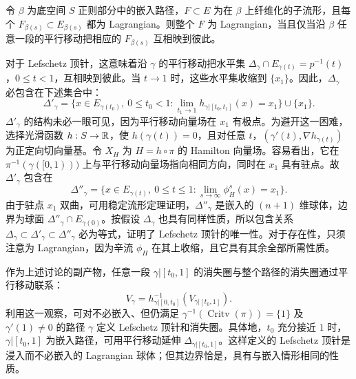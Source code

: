 \clearpage
{}\begin{lemma}\label{st:16.3}
令 $\beta$ 为底空间 $S$ 正则部分中的嵌入路径，$F\subset E$ 为在 $\beta$ 上纤维化的子流形，且每个 $F_{\beta(s)}\subset E_{\beta(s)}$ 都为 Lagrangian。则整个 $F$ 为 Lagrangian，当且仅当沿 $\beta$ 任意一段的平行移动把相应的 $F_{\beta(s)}$ 互相映到彼此。
\end{lemma}

对于 Lefschetz 顶针，这意味着沿 $\gamma$ 的平行移动把水平集 $\Delta_\gamma\cap E_{\gamma(t)}=p^{-1}(t)$，$0\leq t<1$，互相映到彼此。当 $t\to1$ 时，这些水平集收缩到 $\{x_1\}$。因此，$\Delta_\gamma$ 必包含在下述集合中：
\[
\Delta'_\gamma=\{x\in E_{\gamma(t_0)},\ 0\leq t_0<1:
\lim_{t_1\to1}h_{\gamma|[t_0,t_1]}(x)=x_1\}\cup\{x_1\}.
\]
$\Delta'_\gamma$ 的结构未必一眼可见，因为平行移动向量场在 $x_1$ 有极点。为避开这一困难，选择光滑函数 $h:S\to\mathbb R$，使 $h(\gamma(t))=0$，且对任意 $t$，$(\gamma'(t),\nabla h_{\gamma(t)})$ 为正定向切向量基。令 $X_H$ 为 $H=h\circ\pi$ 的 Hamilton 向量场。容易看出，它在 $\pi^{-1}(\gamma([0,1)))$ 上与平行移动向量场指向相同方向，同时在 $x_1$ 具有驻点。故 $\Delta'_\gamma$ 包含在
\begin{equation}\label{eq:16.2}
\Delta''_\gamma=\{x\in E_{\gamma(t)},\ 0\leq t\leq1:
\lim_{s\to\infty}\phi_H^s(x)=x_1\}.
\end{equation}
由于驻点 $x_1$ 双曲，可用稳定流形定理证明，$\Delta''_\gamma$ 是嵌入的 $(n+1)$ 维球体，边界为球面 $\Delta''_\gamma\cap E_{\gamma(0)}$。按假设 $\Delta_\gamma$ 也具有同样性质，所以包含关系 $\Delta_\gamma\subset\Delta'_\gamma\subset\Delta''_\gamma$ 必为等式，证明了 Lefschetz 顶针的唯一性。对于存在性，只须注意为 Lagrangian，因为辛流 $\phi_H$ 在其上收缩，且它具有其余全部所需性质。

\begin{note}\label{st:16.4}
作为上述讨论的副产物，任意一段 $\gamma|[t_0,1]$ 的消失圈与整个路径的消失圈通过平行移动联系：
\begin{equation}\label{eq:16.3}
V_\gamma=h_{\gamma|[0,t_0]}^{-1}(V_{\gamma|[t_0,1]}).
\end{equation}
利用这一观察，可对不必嵌入、但仍满足 $\gamma^{-1}(\operatorname{Critv}(\pi))=\{1\}$ 及 $\gamma'(1)\ne0$ 的路径 $\gamma$ 定义 Lefschetz 顶针和消失圈。具体地，$t_0$ 充分接近 $1$ 时，$\gamma|[t_0,1]$ 为嵌入路径，可用平行移动延伸 $\Delta_{\gamma|[t_0,1]}$。这样定义的 Lefschetz 顶针是浸入而不必嵌入的 Lagrangian 球体；但其边界恰是，具有与嵌入情形相同的性质。
\end{note}

